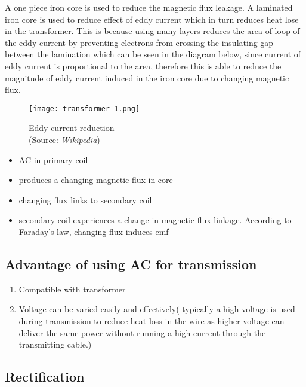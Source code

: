 \documentclass{article}
\begin{document}
A one piece iron core is used to reduce the magnetic flux leakage. A laminated iron core is used to reduce effect of eddy current which in turn reduces heat lose in the transformer. This is because using many layers reduces the area of loop of the eddy current by preventing electrons from crossing the insulating gap between the lamination which can be seen in the diagram below, since current of eddy current is proportional to the area, therefore this is able to reduce the magnitude of eddy current induced in the iron core due to changing magnetic flux.

\begin{figure}[H]
    \centering
    \captionsetup{justification=centering,margin=2cm}
    \texttt{[image: transformer 1.png]}
    \caption*{Eddy current reduction \\ (Source: \textit{Wikipedia})}
\end{figure}

\begin{tcolorbox}[colframe=black!20!white,title=
\textcolor{red}{****Working principle of transformer (4m)}]
\begin{itemize}
\color{red}
    \item AC in primary coil 
    \item produces a changing magnetic flux in core
    \item changing flux links to secondary coil
    \item secondary coil experiences a change in magnetic flux linkage. According to Faraday's law, changing flux induces emf
\end{itemize}
\end{tcolorbox}

\subsection{Advantage of using AC for transmission}

\begin{enumerate}
    \item Compatible with transformer
    \item Voltage can be varied easily and effectively( typically a high voltage is used during transmission to reduce heat loss in the wire as higher voltage can deliver the same power without running a high current through the transmitting cable.)
\end{enumerate}

     \subsection{Rectification}
\end{document}
